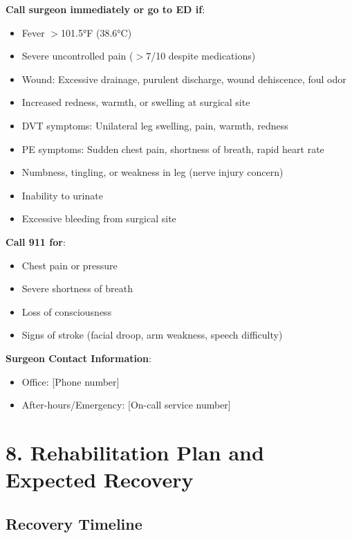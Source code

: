\documentclass[11pt,letterpaper]{article}
\begin{document}
\textbf{Call surgeon immediately or go to ED if}:
\begin{itemize}[leftmargin=*]
    \item Fever $>$101.5°F (38.6°C)
    \item Severe uncontrolled pain ($>$7/10 despite medications)
    \item Wound: Excessive drainage, purulent discharge, wound dehiscence, foul odor
    \item Increased redness, warmth, or swelling at surgical site
    \item DVT symptoms: Unilateral leg swelling, pain, warmth, redness
    \item PE symptoms: Sudden chest pain, shortness of breath, rapid heart rate
    \item Numbness, tingling, or weakness in leg (nerve injury concern)
    \item Inability to urinate
    \item Excessive bleeding from surgical site
\end{itemize}

\textbf{Call 911 for}:
\begin{itemize}[leftmargin=*]
    \item Chest pain or pressure
    \item Severe shortness of breath
    \item Loss of consciousness
    \item Signs of stroke (facial droop, arm weakness, speech difficulty)
\end{itemize}

\textbf{Surgeon Contact Information}:
\begin{itemize}[leftmargin=*]
    \item Office: [Phone number]
    \item After-hours/Emergency: [On-call service number]
\end{itemize}

\section*{8. Rehabilitation Plan and Expected Recovery}

\subsection*{Recovery Timeline}
\end{document}
